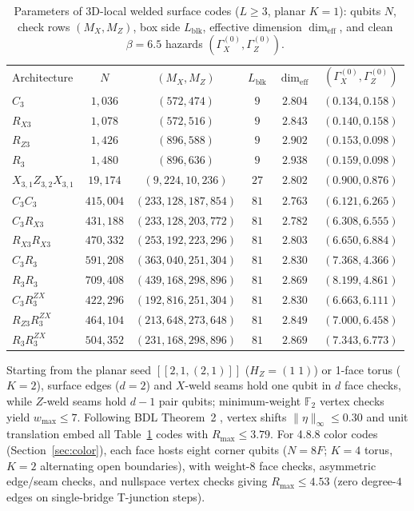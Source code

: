 \documentclass[aps,prx,reprint,superscriptaddress,nofootinbib,floatfix]{revtex4-2}
\begin{document}
\begin{table}[!htbp]
\caption{Parameters of 3D-local welded surface codes ($L \ge 3$, planar $K = 1$): qubits $N$, check rows $(M_X, M_Z)$, box side $L_{\mathrm{blk}}$, effective dimension $\dim_{\mathrm{eff}}$, and clean $\beta = 6.5$ hazards $(\Gamma_X^{(0)}, \Gamma_Z^{(0)})$.}
\label{tab:specs}
{\scriptsize
\setlength{\tabcolsep}{1.5pt}
\begin{ruledtabular}
\begin{tabular}{lccccr}
Architecture & $N$ & $(M_X, M_Z)$ & $L_{\mathrm{blk}}$ & $\dim_{\mathrm{eff}}$ & $(\Gamma_X^{(0)},\Gamma_Z^{(0)})$ \\
\colrule
$C_3$ & $1{,}036$ & $(572, 474)$ & $9$ & $2.804$ & $(0.134, 0.158)$ \\
$R_{X3}$ & $1{,}078$ & $(572, 516)$ & $9$ & $2.843$ & $(0.140, 0.158)$ \\
$R_{Z3}$ & $1{,}426$ & $(896, 588)$ & $9$ & $2.902$ & $(0.153, 0.098)$ \\
$R_3$ & $1{,}480$ & $(896, 636)$ & $9$ & $2.938$ & $(0.159, 0.098)$ \\
$X_{3,1} Z_{3,2} X_{3,1}$ & $19{,}174$ & $(9{,}224, 10{,}236)$ & $27$ & $2.802$ & $(0.900, 0.876)$ \\
$C_3 C_3$ & $415{,}004$ & $(233{,}128, 187{,}854)$ & $81$ & $2.763$ & $(6.121, 6.265)$ \\
$C_3 R_{X3}$ & $431{,}188$ & $(233{,}128, 203{,}772)$ & $81$ & $2.782$ & $(6.308, 6.555)$ \\
$R_{X3} R_{X3}$ & $470{,}332$ & $(253{,}192, 223{,}296)$ & $81$ & $2.803$ & $(6.650, 6.884)$ \\
$C_3 R_3$ & $591{,}208$ & $(363{,}040, 251{,}304)$ & $81$ & $2.830$ & $(7.368, 4.366)$ \\
$R_3 R_3$ & $709{,}408$ & $(439{,}168, 298{,}896)$ & $81$ & $2.869$ & $(8.199, 4.861)$ \\
$C_3 R_3^{ZX}$ & $422{,}296$ & $(192{,}816, 251{,}304)$ & $81$ & $2.830$ & $(6.663, 6.111)$ \\
$R_{Z3} R_3^{ZX}$ & $464{,}104$ & $(213{,}648, 273{,}648)$ & $81$ & $2.849$ & $(7.000, 6.458)$ \\
$R_3 R_3^{ZX}$ & $504{,}352$ & $(231{,}168, 298{,}896)$ & $81$ & $2.869$ & $(7.343, 6.773)$ \\
\end{tabular}
\end{ruledtabular}
}
\end{table}

Starting from the planar seed $[[2, 1, (2, 1)]]$ ($H_Z = (1\;1)$) or 1-face torus ($K = 2$), surface edges ($d = 2$) and $X$-weld seams hold one qubit in $d$ face checks, while $Z$-weld seams hold $d - 1$ pair qubits; minimum-weight $\mathbb{F}_2$ vertex checks yield $w_{\max} \le 7$. Following BDL Theorem~2 \cite{selfcorrecting3D}, vertex shifts $\|\eta\|_\infty \le 0.30$ and unit translation embed all Table~\ref{tab:specs} codes with $R_{\max} \le 3.79$. For 4.8.8 color codes (Section~\ref{sec:color}), each face hosts eight corner qubits ($N = 8F$; $K = 4$ torus, $K = 2$ alternating open boundaries), with weight-8 face checks, asymmetric edge/seam checks, and nullspace vertex checks giving $R_{\max} \le 4.53$ (zero degree-$4$ edges on single-bridge T-junction steps).
\end{document}
